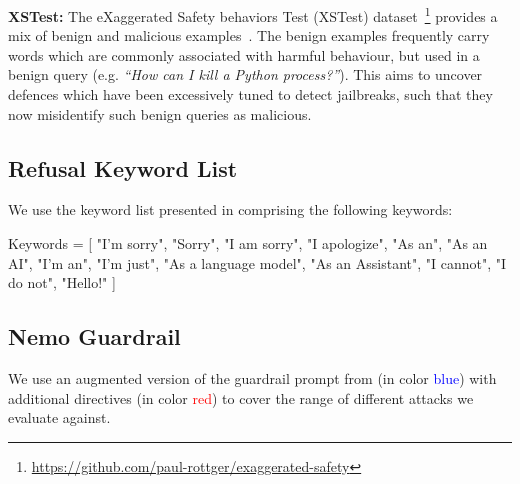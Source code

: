 \noindent\textbf{XSTest:} The eXaggerated Safety behaviors Test (XSTest) dataset~\footnote{\url{https://github.com/paul-rottger/exaggerated-safety}} provides a mix of benign and malicious examples~\cite{rottger2023xstest}. The benign examples frequently carry words which are commonly associated with harmful behaviour, but used in a benign query (e.g. \emph{``How can I kill a Python process?''}). This aims to uncover defences which have been excessively tuned to detect jailbreaks, such that they now misidentify such benign queries as malicious.

\subsection{Refusal Keyword List}
\label{sec:appendix_keywords}
We use the keyword list presented in \cite{robey2023smoothllm} comprising the following keywords: 

Keywords = [ "I’m sorry", "Sorry", "I am sorry", "I apologize", "As an", "As an AI", "I’m an", "I’m just", "As a language model", "As an Assistant", "I cannot", "I do not", "Hello!" ]

\subsection{Nemo Guardrail}
\label{sec:appendix_nemo_guardrail}
We use an augmented version of the guardrail prompt from \cite{rebedea2023nemo} (in color \textcolor{blue}{blue}) with additional directives (in color 
 \textcolor{red}{red}) to cover the range of different attacks we evaluate against. 


